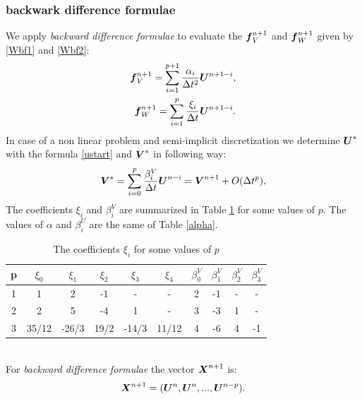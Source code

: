 \documentclass[english,a4paper]{article}
\newcommand{\Xbf}{\text{\mbox{\boldmath $X$}}}
\newcommand{\Ubf}{\text{\mbox{\boldmath $U$}}}
\newcommand{\Abf}{\text{\mbox{\boldmath $W$}}}
\newcommand{\fbf}{\text{\mbox{\boldmath $f$}}}
\newcommand{\Wbf}{\text{\mbox{\boldmath $V$}}}
\begin{document}
\subsubsection{backwark difference formulae}
We apply {\sl backward difference formulae } to evaluate the $\fbf_V^{n+1}$
and $\fbf_W^{n+1}$  given by \eqref{Wbf1} and \eqref{Wbf2}:
\begin{eqnarray*}
\displaystyle\fbf_V^{n+1}=\sum_{i=1}^{p+1}\frac{\alpha_i}{\Delta
  t^2}\Ubf^{n+1-i},
\\
\displaystyle\fbf_W^{n+1}=\sum_{i=1}^p\frac{\xi_i}{\Delta t}\Ubf^{n+1-i}.
\end{eqnarray*}
In case of a non linear problem and semi-implicit discretization we
determine $\Ubf^*$ with the formula \eqref{ustart} and $\Wbf^*$ in
following way:
\begin{equation}\label{ustart}
\Wbf^*=\sum_{i=0}^p \frac{\beta_i^V}{\Delta t}\Ubf^{n-i}=\Wbf^{n+1}+O(\Delta t^p),
\end{equation}
The coefficients $\xi_i$ and $\beta_i^V$ are summarized in Table \ref{xi} for some values
of $p$. The values of $\alpha$ and $\beta_i^U$ are the same of  Table \ref{alpha}.
\begin{table}[!htp]
\begin{center}
\begin{tabular}{| c | c c c c c | c c c c | }
\hline
p & $\xi_0$ & $\xi_1$ &  $\xi_2$  & $\xi_3$ & $\xi_4$ & $\beta_0^V$
&$\beta_1^V$ &$\beta_2^V$ &$\beta_3^V$  \\
\hline
1 &  1      &   2    &    -1      &   -    &    -  & 2 & -1 & - & -  \\
2 &  2      &   5    &    -4      &   1   &    -   & 3 & -3 & 1 & -  \\
3 & 35/12   &  -26/3  &   19/2    &  -14/3 & 11/12 & 4 & -6 & 4 & -1 \\
\hline
\end{tabular}
\end{center}
\caption{The coefficients $\xi_i$  for some values of
$p$ }\label{xi}
\end{table}
\\
For  {\sl backward difference formulae} the vector $\Xbf^{n+1}$ is:
$$\Xbf^{n+1}=(\Ubf^{n}, \Ubf^n,..., \Ubf^{n-p}).$$
\end{document}
